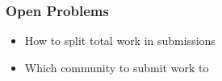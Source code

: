 \documentclass[aspectratio=169,nototalframenumber]{beamer}
\begin{document}
\begin{frame}
    \frametitle{Open Problems}

    \begin{itemize}
        \item How to split total work in submissions
        \item Which community to submit work to
    \end{itemize}
\end{frame}

\end{document}
